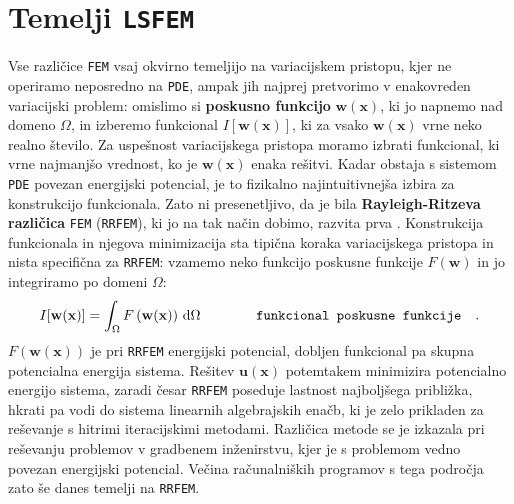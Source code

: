 \section{Temelji \texttt{LSFEM}}

Vse različice \texttt{FEM} vsaj okvirno temeljijo na variacijskem pristopu, kjer ne operiramo neposredno na \texttt{PDE}, ampak jih najprej pretvorimo v enakovreden variacijski problem: omislimo si \textbf{poskusno funkcijo} $\mathbf{w}(\mathbf{x})$, ki jo napnemo nad domeno $\Omega$, in izberemo funkcional $I[\mathbf{w}(\mathbf{x})]$, ki za vsako $\mathbf{w}(\mathbf{x})$ vrne neko realno število. Za uspešnost variacijskega pristopa moramo izbrati funkcional, ki vrne najmanjšo vrednost, ko je $\mathbf{w}(\mathbf{x})$ enaka rešitvi. Kadar obstaja s sistemom \texttt{PDE} povezan energijski potencial, je to fizikalno najintuitivnejša izbira za konstrukcijo funkcionala. Zato ni presenetljivo, da je bila \textbf{Rayleigh-Ritzeva različica} \texttt{FEM} (\texttt{RRFEM}), ki jo na tak način dobimo, razvita prva \cite{RitzW-Variationsprobleme}. Konstrukcija funkcionala in njegova minimizacija sta tipična koraka variacijskega pristopa in nista specifična za \texttt{RRFEM}: vzamemo neko funkcijo poskusne funkcije $F\left(\mathbf{w}\right)$ in jo integriramo po domeni $\Omega$:
\begin{equation}
	I[\mathbf{w(x)}] = \int_{\Omega} F\left(\mathbf{w(x)}\right) \, \mathrm{d} \Omega \hspace{1.4cm} \texttt{funkcional poskusne funkcije} \quad .
	\label{eq:GeneralFunctional}
\end{equation}
$F\left(\mathbf{w}(\mathbf{x})\right)$ je pri \texttt{RRFEM} energijski potencial, dobljen funkcional pa skupna potencialna energija sistema. Rešitev $\mathbf{u}(\mathbf{x})$ potemtakem minimizira potencialno energijo sistema, zaradi česar \texttt{RRFEM} poseduje last\-nost najboljšega približka, hkrati pa vodi do sistema linearnih algebrajskih enačb, ki je zelo prikladen za reševanje s hitrimi iteracijskimi metodami. Različica metode se je izkazala pri reševanju problemov v gradbenem inženirstvu, kjer je s problemom vedno povezan energijski potencial. Večina računalniških programov s tega področja zato še danes temelji na \texttt{RRFEM}.

